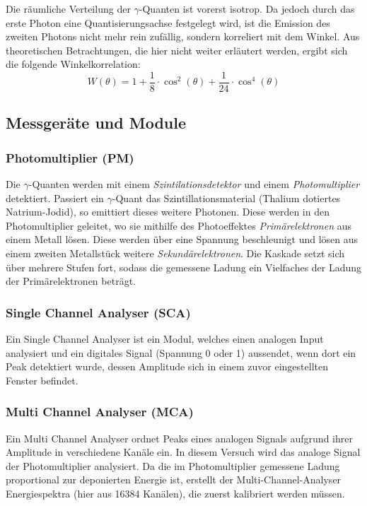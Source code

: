 \documentclass{../Misc/MontavonLaTeX/Montavon}
\begin{document}
Die räumliche Verteilung der $\gamma$-Quanten ist vorerst isotrop. Da jedoch durch das erste Photon eine Quantisierungsachse festgelegt wird, ist die Emission des zweiten Photons nicht mehr rein zufällig, sondern korreliert mit dem Winkel. 
Aus theoretischen Betrachtungen, die hier nicht weiter erläutert werden, ergibt sich die folgende Winkelkorrelation:
\[
	W(\theta) = 1 + \frac{1}{8} \cdot \cos^2(\theta) + \frac{1}{24} \cdot \cos^4(\theta)
\]

\subsection{Messgeräte und Module}
\subsubsection{Photomultiplier (PM)}
Die $\gamma$-Quanten werden mit einem \emph{Szintilationsdetektor} und einem \emph{Photomultiplier} detektiert. Passiert ein $\gamma$-Quant das Szintillationsmaterial (Thalium dotiertes Natrium-Jodid), so emittiert dieses weitere Photonen. Diese werden in den Photomultiplier geleitet, wo sie mithilfe des Photoeffektes \emph{Primärelektronen} aus einem Metall lösen. Diese werden über eine Spannung beschleunigt und lösen aus einem zweiten Metallstück weitere \emph{Sekundärelektronen}. Die Kaskade setzt sich über mehrere Stufen fort, sodass die gemessene Ladung ein Vielfaches der Ladung der Primärelektronen beträgt.

\subsubsection{Single Channel Analyser (SCA)}
Ein Single Channel Analyser ist ein Modul, welches einen analogen Input analysiert und ein digitales Signal (Spannung 0 oder 1) aussendet, wenn dort ein Peak detektiert wurde, dessen Amplitude sich in einem zuvor eingestellten Fenster befindet.

\subsubsection{Multi Channel Analyser (MCA)}
Ein Multi Channel Analyser ordnet Peaks eines analogen Signals aufgrund ihrer Amplitude in verschiedene Kanäle ein. In diesem Versuch wird das analoge Signal der Photomultiplier analysiert. Da die im Photomultiplier gemessene Ladung proportional zur deponierten Energie ist, erstellt der Multi-Channel-Analyser Energiespektra (hier aus 16384 Kanälen), die zuerst kalibriert werden müssen. 
\end{document}
